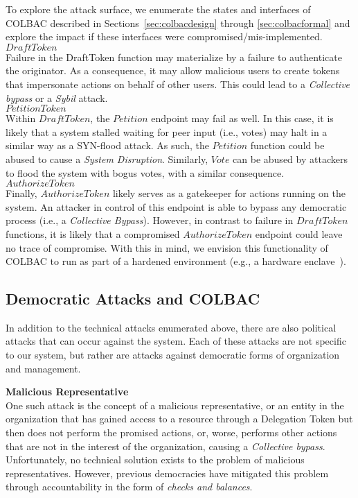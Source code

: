 To explore the attack surface, we enumerate the states and interfaces of
COLBAC described in Sections~\ref{sec:colbacdesign} through 
\ref{sec:colbacformal} and explore the impact if these interfaces were
compromised/mis-implemented.\\

\noindent$DraftToken$\mbox{}\\
Failure in the DraftToken function may materialize by a failure to authenticate
the originator. As a consequence, it may allow malicious users to create tokens
that impersonate actions on behalf of other users. This could lead to a
\emph{Collective bypass} or a \emph{Sybil} attack.\\

\noindent$PetitionToken$\mbox{}\\
Within $DraftToken$, the $Petition$ endpoint may fail as well. In this case, it
is likely that a system stalled waiting for peer input (i.e., votes) may halt
in a similar way as a SYN-flood attack. As such, the $Petition$ function could
be abused to cause a \emph{System Disruption}. Similarly, $Vote$ can be abused
by attackers to flood the system with bogus votes, with a similar consequence.\\

\noindent$AuthorizeToken$\mbox{}\\
Finally, $AuthorizeToken$ likely serves as a gatekeeper for actions running on
the system. An attacker in control of this endpoint is able to bypass any
democratic process (i.e., a \emph{Collective Bypass}). However, in contrast to
failure in $DraftToken$ functions, it is likely that a compromised
$AuthorizeToken$ endpoint could leave no trace of compromise. With this in
mind, we envision this functionality of COLBAC to run as part of a hardened
environment (e.g., a hardware enclave~\cite{sgx}).

\subsection{Democratic Attacks and COLBAC}
In addition to the technical attacks enumerated above, there are also political
attacks that can occur against the system. Each of these attacks are not
specific to our system, but rather are attacks against democratic forms of
organization and management.

\noindent\textbf{Malicious Representative}\mbox{}\\
One such attack is the concept of a malicious representative, or an entity in
the organization that has gained access to a resource through a Delegation Token
but then does not perform the promised actions, or, worse, performs other
actions that are not in the interest of the organization, causing a
\emph{Collective bypass}. Unfortunately, no technical solution exists to the
problem of malicious representatives. However, previous democracies have
mitigated this problem through accountability in the form of \emph{checks and
balances}.

